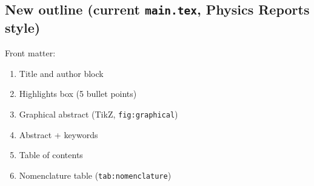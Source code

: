 \documentclass[12pt,a4paper]{article}
\begin{document}
\subsection*{New outline (current {\tt main.tex}, Physics Reports style)}
Front matter:
\begin{enumerate}[nosep,leftmargin=1.6em]
\item Title and author block
\item Highlights box (5 bullet points)
\item Graphical abstract (TikZ, {\tt fig:graphical})
\item Abstract + keywords
\item Table of contents
\item Nomenclature table ({\tt tab:nomenclature})
\end{enumerate}
\end{document}
